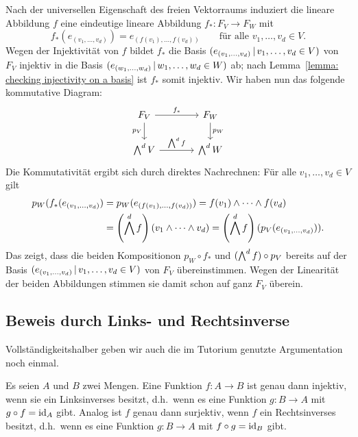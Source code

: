 Nach der universellen Eigenschaft des freien Vektorraums induziert die lineare Abbildung $f$ eine eindeutige lineare Abbildung $f_* \colon F_V \to F_W$ mit
\[
    f_*( e_{(v_1, \dotsc, v_d)} )
  = e_{(f(v_1), \dotsc, f(v_d))}
  \qquad
  \text{für alle $v_1, \dotsc, v_d \in V$}.
\]
Wegen der Injektivität von $f$ bildet $f_*$ die Basis $(e_{(v_1, \dotsc, v_d)} \,|\, v_1, \dotsc, v_d \in V)$ von $F_V$ injektiv in die Basis $(e_{(w_1, \dotsc, w_d)} \,|\, w_1, \dotsc, w_d \in W)$ ab;
nach Lemma~\ref{lemma: checking injectivity on a basis} ist $f_*$ somit injektiv.
Wir haben nun das folgende kommutative Diagram:
\[
  \begin{tikzcd}[column sep = large]
      F_V
      \arrow{r}{f_*}
      \arrow[swap]{d}{p_V}
    & F_W
      \arrow{d}{p_W}
    \\
      \exteriorpower{d}{V}
      \arrow{r}{\exteriorpower{d}{f}}
    & \exteriorpower{d}{W}
  \end{tikzcd}
\]
Die Kommutativität ergibt sich durch direktes Nachrechnen:
Für alle $v_1, \dotsc, v_d \in V$ gilt
\begin{align*}
      p_W( f_*( e_{(v_1, \dotsc, v_d)} )
  &=  p_W( e_{(f(v_1), \dotsc, f(v_d))} )
   =  f(v_1) \wedge \dotsb \wedge f(v_d)
  \\
  &=  \left( \bigwedge^{d} f \right)( v_1 \wedge \dotsb \wedge v_d )
   =  \left( \bigwedge^{d} f \right)( p_V( e_{(v_1, \dotsc, v_d)} ) ).
\end{align*}
Das zeigt, dass die beiden Kompositionon $p_W \circ f_*$ und $(\bigwedge^{d} f) \circ p_V$ bereits auf der Basis $(e_{(v_1, \dotsc, v_d)} \,|\, v_1, \dotsc, v_d \in V)$ von $F_V$ übereinstimmen.
Wegen der Linearität der beiden Abbildungen stimmen sie damit schon auf ganz $F_V$ überein.











\subsection{Beweis durch Links- und Rechtsinverse}

Vollständigkeitshalber geben wir auch die im Tutorium genutzte Argumentation noch einmal.

\begin{recall}
  Es seien $A$ und $B$ zwei Mengen.
  Eine Funktion $f \colon A \to B$ ist genau dann injektiv, wenn sie ein Linksinverses besitzt, d.h.\ wenn es eine Funktion $g \colon B \to A$ mit $g \circ f = \operatorname{id}_A$ gibt.
  Analog ist $f$ genau dann surjektiv, wenn $f$ ein Rechtsinverses besitzt, d.h.\ wenn es eine Funktion $g \colon B \to A$ mit $f \circ g = \operatorname{id}_B$ gibt.
\end{recall}

